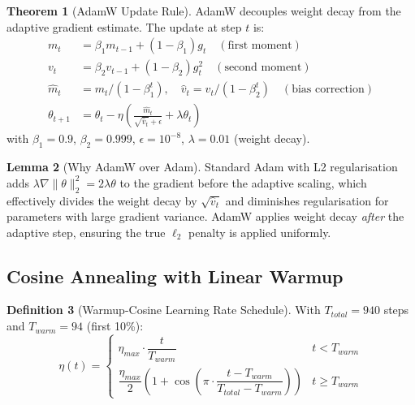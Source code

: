 \documentclass[12pt,a4paper]{article}
\theoremstyle{definition}
\newtheorem{theorem}{Theorem}[section]
\newtheorem{lemma}[theorem]{Lemma}
\newtheorem{definition}[theorem]{Definition}
\begin{document}
\begin{theorem}[AdamW Update Rule]
AdamW decouples weight decay from the adaptive gradient estimate. The update at step $t$ is:
\begin{align}
m_t &= \beta_1 m_{t-1} + (1-\beta_1) g_t \quad (\text{first moment}) \\
v_t &= \beta_2 v_{t-1} + (1-\beta_2) g_t^2 \quad (\text{second moment}) \\
\hat{m}_t &= m_t / (1-\beta_1^t), \quad \hat{v}_t = v_t / (1-\beta_2^t) \quad (\text{bias correction}) \\
\theta_{t+1} &= \theta_t - \eta\left(\frac{\hat{m}_t}{\sqrt{\hat{v}_t} + \epsilon} + \lambda \theta_t\right)
\end{align}
with $\beta_1=0.9$, $\beta_2=0.999$, $\epsilon=10^{-8}$, $\lambda=0.01$ (weight decay).
\end{theorem}

\begin{lemma}[Why AdamW over Adam]
Standard Adam with L2 regularisation adds $\lambda \nabla \|\theta\|_2^2 = 2\lambda\theta$ to the gradient before the adaptive scaling, which effectively divides the weight decay by $\sqrt{\hat{v}_t}$ and diminishes regularisation for parameters with large gradient variance. AdamW applies weight decay \emph{after} the adaptive step, ensuring the true $\ell_2$ penalty is applied uniformly.
\end{lemma}

\subsection{Cosine Annealing with Linear Warmup}

\begin{definition}[Warmup-Cosine Learning Rate Schedule]
With $T_{total} = 940$ steps and $T_{warm} = 94$ (first 10\%):
$$\eta(t) = \begin{cases}
\eta_{max} \cdot \dfrac{t}{T_{warm}} & t < T_{warm} \\[6pt]
\dfrac{\eta_{max}}{2}\!\left(1 + \cos\!\left(\pi \cdot \dfrac{t - T_{warm}}{T_{total} - T_{warm}}\right)\right) & t \geq T_{warm}
\end{cases}$$
\end{definition}
\end{document}
